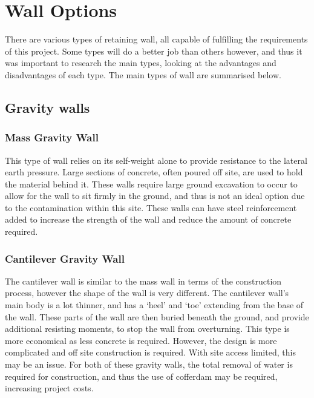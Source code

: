 \documentclass[12pt, a4paper]{article}
\begin{document}
\section{Wall Options}
\begin{justify}
There are various types of retaining wall, all capable of fulfilling the requirements of this project. Some types will do a better job than others however, and thus it was important to research the main types, looking at the advantages and disadvantages of each type. The main types of wall are summarised below. 
\end{justify}
\subsection{Gravity walls}
\subsubsection{Mass Gravity Wall}
\begin{justify}
This type of wall relies on its self-weight alone to provide resistance to the lateral earth pressure. Large sections of concrete, often poured off site, are used to hold the material behind it. These walls require large ground excavation to occur to allow for the wall to sit firmly in the ground, and thus is not an ideal option due to the contamination within this site. These walls can have steel reinforcement added to increase the strength of the wall and reduce the amount of concrete required.
\end{justify}
\subsubsection{Cantilever Gravity Wall}
\begin{justify}
The cantilever wall is similar to the mass wall in terms of the construction process, however the shape of the wall is very different. The cantilever wall's main body is a lot thinner, and has a `heel' and `toe' extending from the base of the wall. These parts of the wall are then buried beneath the ground, and provide additional resisting moments, to stop the wall from overturning. This type is more economical as less concrete is required. However, the design is more complicated and off site construction is required. With site access limited, this may be an issue. For both of these gravity walls, the total removal of water is required for construction, and thus the use of cofferdam may be required, increasing project costs.
\end{justify}
\end{document}
